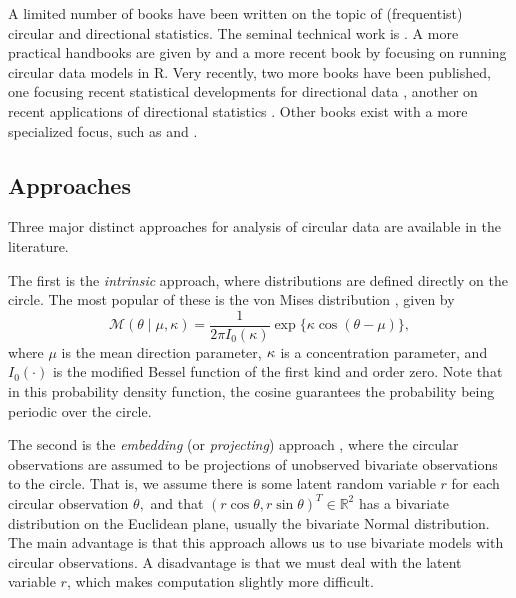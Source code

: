 \documentclass[12pt, a4paper]{book}\usepackage[]{graphicx}\usepackage{xcolor}
\let\proglang=\textsf
\begin{document}
A limited number of books have been written on the topic of (frequentist) circular and directional statistics. The seminal technical work is \citet{mardia2009directional}. A more practical handbooks are given by \citet{fisher1995statistical} and a more recent book by \citet{pewsey2013circular} focusing on running circular data models in \proglang{R}. Very recently, two more books have been published, one focusing recent statistical developments for directional data \citep{ley2017modern}, another on recent applications of directional statistics \citep{ley2018applied}. Other books exist with a more specialized focus, such as \citet{batschelet1981circular} and \citet{jammalamadaka2001topics}.

\subsection*{Approaches}

Three major distinct approaches for analysis of circular data are available in the literature.

The first is the \textit{intrinsic} approach, where distributions are defined directly on the circle. The most popular of these is the von Mises distribution \cite{von1918ganzzahligkeit}, given by
\begin{equation}
\mathcal{M}(\theta \mid \mu, \kappa) = \frac{1}{2 \pi I_0(\kappa)} \exp\{\kappa \cos(\theta - \mu)\},
\end{equation}
where $\mu$ is the mean direction parameter, $\kappa$ is a concentration parameter, and $I_0(\cdot)$ is the modified Bessel function of the first kind and order zero. Note that in this probability density function, the cosine guarantees the probability being periodic over the circle.

The second is the  \textit{embedding} (or \textit{projecting}) approach \citep{presnell1998projected, Nunez-Antonio2005}, where the circular observations are assumed to be projections of unobserved bivariate observations to the circle. That is, we assume there is some latent random variable $r$ for each circular observation $\theta,$ and that $(r \cos\theta, r \sin\theta)^T \in \mathbb{R}^2$  has a bivariate distribution on the Euclidean plane, usually the bivariate Normal distribution. The main advantage is that this approach allows us to use bivariate models with circular observations. A disadvantage is that we must deal with the latent variable $r$, which makes computation slightly more difficult.
\end{document}
